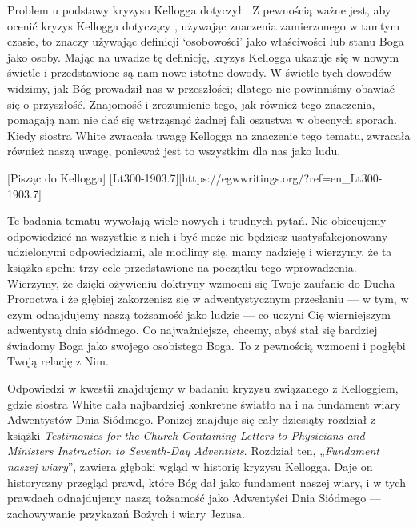 Problem u podstawy kryzysu Kellogga dotyczył . Z pewnością ważne jest, aby ocenić kryzys Kellogga dotyczący , używając znaczenia zamierzonego w tamtym czasie, to znaczy używając definicji ‘osobowości’ jako właściwości lub stanu Boga jako osoby. Mając na uwadze tę definicję, kryzys Kellogga ukazuje się w nowym świetle i przedstawione są nam nowe istotne dowody. W świetle tych dowodów widzimy, jak Bóg prowadził nas w przeszłości; dlatego nie powinniśmy obawiać się o przyszłość. Znajomość i zrozumienie tego, jak również tego znaczenia, pomagają nam nie dać się wstrząsnąć żadnej fali oszustwa w obecnych sporach. Kiedy siostra White zwracała uwagę Kellogga na znaczenie tego tematu, zwracała również naszą uwagę, ponieważ jest to wszystkim dla nas jako ludu.

[Pisząc do Kellogga] [Lt300-1903.7][https://egwwritings.org/?ref=en\_Lt300-1903.7]

Te badania tematu  wywołają wiele nowych i trudnych pytań. Nie obiecujemy odpowiedzieć na wszystkie z nich i być może nie będziesz usatysfakcjonowany udzielonymi odpowiedziami, ale modlimy się, mamy nadzieję i wierzymy, że ta książka spełni trzy cele przedstawione na początku tego wprowadzenia. Wierzymy, że dzięki ożywieniu doktryny  wzmocni się Twoje zaufanie do Ducha Proroctwa i że głębiej zakorzenisz się w adwentystycznym przesłaniu — w tym, w czym odnajdujemy naszą tożsamość jako ludzie — co uczyni Cię wierniejszym adwentystą dnia siódmego. Co najważniejsze, chcemy, abyś stał się bardziej świadomy Boga jako swojego osobistego Boga. To z pewnością wzmocni i pogłębi Twoją relację z Nim.

Odpowiedzi w kwestii  znajdujemy w badaniu kryzysu związanego z Kelloggiem, gdzie siostra White dała najbardziej konkretne światło na  i na fundament wiary Adwentystów Dnia Siódmego. Poniżej znajduje się cały dziesiąty rozdział z książki \textit{Testimonies for the Church Containing Letters to Physicians and Ministers Instruction to Seventh-Day Adventists}. Rozdział ten, „\textit{Fundament naszej wiary}”, zawiera głęboki wgląd w historię kryzysu Kellogga. Daje on historyczny przegląd prawd, które Bóg dał jako fundament naszej wiary, i w tych prawdach odnajdujemy naszą tożsamość jako Adwentyści Dnia Siódmego — zachowywanie przykazań Bożych i wiary Jezusa.

